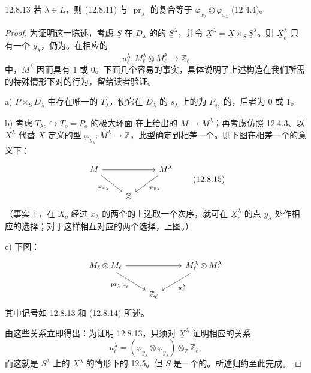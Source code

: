 \begin{SGAresult}{}{12.8.13}
若 $\lambda\in L$，则 (12.8.11) 与 $\operatorname{pr}_\lambda$ 的复合等于 $\varphi_{x_\lambda}\otimes\varphi_{x_\lambda}$ (12.4.4)。
\end{SGAresult}
\begin{proof}
为证明这一陈述，考虑 $\underline S$ 在 $D_\lambda$ 的的 $\underline S^\lambda$，并令 $\underline X^\lambda=\underline X\times_{\underline S}\underline S^\lambda$。则 $\underline X_o^\lambda$ 只有一个 $y_\lambda$，仍为。在相应的
\[
 u_\ell^\lambda:M_\ell^\lambda\otimes M_\ell^\lambda\longrightarrow\mathbb Z_\ell\tag{12.8.14}
\]
中，$M^\lambda$ 因而具有 $1$ 或 $0$。下面几个容易的事实，具体说明了上述构造在我们所需的特殊情形下对的行为，留给读者验证。

\textup{a)} $P\times_{\underline S}D_\lambda$ 中存在唯一的 $T_\lambda$，使它在 $D_\lambda$ 的 $s_\lambda$ 上的为 $P_{s_\lambda}$ 的，后者为 $0$ 或 $1$。

\textup{b)} 考虑
$T_{\lambda o}\hookrightarrow T_o=P_o\text{ 的极大环面}$ 在上给出的 $M\to M^\lambda$；再考虑仿照 12.4.3、以 $\underline X^\lambda$ 代替 $X$ 定义的型 $\varphi_{y_\lambda}:M^\lambda\to\mathbb Z$，此型确定到相差一个。则下图在相差一个的意义下：
\[
\begin{tikzcd}
 M\arrow[rr]\arrow[dr,"\varphi_{x_\lambda}"']&&M^\lambda\arrow[dl,"\varphi_{y_\lambda}"]\\
 &\mathbb Z&
\end{tikzcd}\tag{12.8.15}
\]
（事实上，在 $X_o$ 经过 $x_\lambda$ 的两个的上选取一个次序，就可在 $\underline X_o^\lambda$ 的点 $y_\lambda$ 处作相应的选择；对于这样相互对应的两个选择，上图。）

\textup{c)} 下图：
\[
\begin{tikzcd}
 M_\ell\otimes M_\ell\arrow[rr]\arrow[dr,"\operatorname{pr}_\lambda\underline u_\ell"']
 &&M_\ell^\lambda\otimes M_\ell^\lambda\arrow[dl,"u_\ell^\lambda"]\\
 &\mathbb Z_\ell&
\end{tikzcd}
\]
其中记号如 12.8.13 和 (12.8.14) 所述。

由这些关系立即得出：为证明 12.8.13，只须对 $\underline X^\lambda$ 证明相应的关系
\[
 u_\ell^\lambda=(\varphi_{y_\lambda}\otimes\varphi_{y_\lambda})
 \otimes_{\mathbb Z}\mathbb Z_\ell,
\]
而这就是 $\underline S^\lambda$ 上的 $\underline X^\lambda$ 的情形下的 12.5。但 $\underline S$ 是一个的。所述归约至此完成。
\end{proof}

